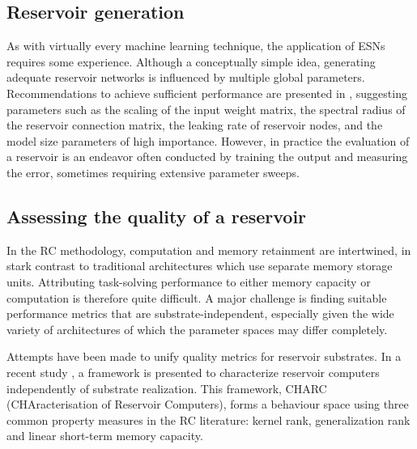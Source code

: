 

\subsection{Reservoir generation}

As with virtually every machine learning technique, the application of ESNs
requires some experience. Although a conceptually simple idea, generating
adequate reservoir networks is influenced by multiple global
parameters. Recommendations to achieve sufficient performance are presented in
\cite{montavon_practical_2012, jaeger_tutorial_nodate}, suggesting parameters
such as the scaling of the input weight matrix, the spectral radius of the
reservoir connection matrix, the leaking rate of reservoir nodes, and the model
size parameters of high importance. However, in practice the evaluation of a
reservoir is an endeavor often conducted by training the output and measuring
the error, sometimes requiring extensive parameter sweeps.




\subsection{Assessing the quality of a reservoir}

In the RC methodology, computation and memory retainment are intertwined, in
stark contrast to traditional architectures which use separate memory storage
units. Attributing task-solving performance to either memory capacity or
computation is therefore quite difficult. A major challenge is finding suitable
performance metrics that are substrate-independent, especially given the wide
variety of architectures of which the parameter spaces may differ completely.

Attempts have been made to unify quality metrics for reservoir substrates. In a
recent study \cite{dale_substrate-independent_2019}, a framework is presented to
characterize reservoir computers independently of substrate realization. This
framework, CHARC (CHAracterisation of Reservoir Computers), forms a behaviour
space using three common property measures in the RC literature: kernel rank,
generalization rank and linear short-term memory capacity.

